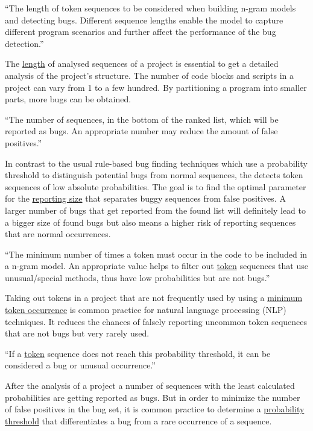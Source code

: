 \begin{definition}\label{def:sequence_length}
    ``The length of token sequences to be considered when building n-gram models and detecting bugs. Different sequence lengths enable the model to capture different program scenarios and further affect the performance of the bug detection.''~\cite{bugram}
\end{definition}

The \hyperref[def:sequence_length]{length} of analysed sequences of a project is essential to get a detailed analysis of the project's structure. The number of code blocks and scripts in a \scratch{} project can vary from 1 to a few hundred. By partitioning a program into smaller parts, more bugs can be obtained.

\begin{definition}\label{def:reporting_size}
    ``The number of sequences, in the bottom of the ranked list, which will be reported as bugs. An appropriate number may reduce the amount of false positives.''~\cite{bugram}
\end{definition}

In contrast to the usual rule-based bug finding techniques which use a probability threshold to distinguish potential bugs from normal sequences, the \ngram{} detects token sequences of low absolute probabilities. The goal is to find the optimal parameter for the \hyperref[def:reporting_size]{reporting size} that separates buggy sequences from false positives. A larger number of bugs that get reported from the found list will definitely lead to a bigger size of found bugs but also means a higher risk of reporting sequences that are normal occurrences.

\begin{definition}\label{def:minimum_token_occurrence}
    ``The minimum number of times a token must occur in the code to be included in a n-gram model. An appropriate value helps to filter out \hyperref[def:token]{token} sequences that use unusual/special methods, thus have low probabilities but are not bugs.''~\cite{bugram}
\end{definition}

Taking out tokens in a project that are not frequently used by using a \hyperref[def:minimum_token_occurrence]{minimum token occurrence} is common practice for natural language processing (NLP) techniques. It reduces the chances of falsely reporting uncommon token sequences that are not bugs but very rarely used. 

\begin{definition}\label{def:probability_threshold}
    ``If a \hyperref[def:token]{token} sequence does not reach this probability threshold, it can be considered a bug or unusual occurrence.''
\end{definition}

After the analysis of a project a number of sequences with the least calculated probabilities are getting reported as bugs. But in order to minimize the number of false positives in the bug set, it is common practice to determine a \hyperref[def:probability_threshold]{probability threshold} that differentiates a bug from a rare occurrence of a sequence. 